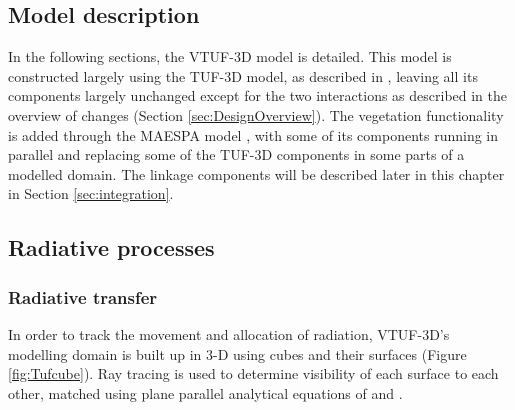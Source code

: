 \documentclass[preprint,12pt,authoryear]{elsarticle}
\begin{document}
\subsection{Model description}
In the following sections, the VTUF-3D model is detailed. This model is constructed largely using the TUF-3D model, as described in \cite{Krayenhoff2007}, leaving all its components largely unchanged except for the two interactions as described in the overview of changes (Section \ref{sec:DesignOverview}). The vegetation functionality is added through the MAESPA model \citep{Duursma2012}, with some of its components running in parallel and replacing some of the TUF-3D components in some parts of a modelled domain. The linkage components will be described later in this chapter in Section \ref{sec:integration}.

\subsection{Radiative processes}
\subsubsection{Radiative transfer}\label{sec:radiativetransfer}

In order to track the movement and allocation of radiation, VTUF-3D's modelling domain is built up in 3-D using cubes and their surfaces (Figure \ref{fig:Tufcube}). Ray tracing is used to determine visibility of each surface to each other, matched using plane parallel analytical equations of \cite{Siegel2001} and \cite{Hottel1967}. 

\end{document}
